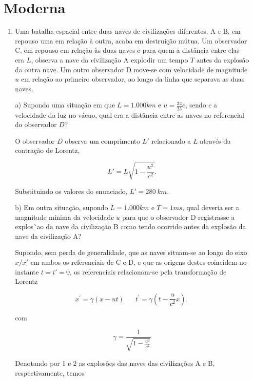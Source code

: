%
%
\chapter{Moderna}

\begin{enumerate}[start=1,label={\bfseries Q\arabic*.}]

\item Uma batalha espacial entre duas naves de civilizações diferentes, A e B, em repouso uma em relação à outra, acaba em destruição mútua. Um observador C, em repouso em relação às duas naves e para quem a distância entre elas era $L$, observa a nave da civilização A explodir um tempo $T$ antes da explosão da outra nave. Um outro observador D move-se com velocidade de magnitude $u$ em relação ao primeiro observador, ao longo da linha que separava as duas naves.


a) Supondo uma situação em que $L = 1.000 km$ e $u = \frac{24}{25}c$, sendo $c$ a velocidade da luz no vácuo, qual era a distância entre as naves no referencial do observador $D$?

    {\color{red}
    O observador $D$ observa um comprimento $L'$ relacionado a $L$ através da contração de Lorentz,

    $$
    L' = L \sqrt{1 - \frac{u^{2}}{c^{2}}}.
    $$

    Substituindo os valores do enunciado, $L' = 280 \ km$.


    }

b) Em outra situação, supondo $L = 1.000 km$ e $T = 1 ms$, qual deveria ser a magnitude mínima da velocidade $u$ para que o observador D registrasse a explos˜ao da nave da civilização B como tendo ocorrido antes da explosão da nave da civilização A?

    {\color{red}

    Supondo, sem perda de generalidade, que as naves situam-se ao longo do eixo $x/x'$ em ambos os referenciais de C e D, e que as origens destes coincidem no instante $t = t' = 0$, os referenciais relacionam-se pela transformação de Lorentz

    $$
    x^{\prime} = \gamma (x - ut) \quad \ \ \ t^{\prime} = \gamma \left( t - \frac{u}{c^{2}} x \right),
    $$

    com

    $$
    \gamma = \frac{1}{\sqrt{1-\frac{u^{2}}{c^{2}}}}
    $$

    Denotando por 1 e 2 as explosões das naves das civilizações A e B, respectivamente, temos


}
\end{enumerate}
